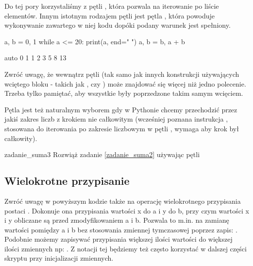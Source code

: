 \documentclass{pdfBooklets}
\begin{document}
Do tej pory korzystaliśmy z pętli , która pozwala na iterowanie po liście elementów. Innym istotnym rodzajem pętli
jest pętla , która powoduje wykonywanie zawartego w niej kodu dopóki podany warunek jest spełniony.

\begin{CodeFrame}[python]{0.50\textwidth}
a, b = 0, 1
while a <= 20:
    print(a, end=" ")
    a, b = b, a + b
\end{CodeFrame}
\begin{CodeFrame}{auto}
0 1 1 2 3 5 8 13
\end{CodeFrame}

Zwróć uwagę, że wewnątrz pętli  (tak samo jak innych konstrukcji używających wciętego bloku - takich jak , czy )
może znajdować się więcej niż jedno polecenie. Trzeba tylko pamiętać, aby wszystkie były poprzedzone takim samym wcięciem.

Pętla  jest też naturalnym wyborem gdy w Pythonie chcemy przechodzić przez jakiś zakres liczb z krokiem nie całkowitym
	(wcześniej poznana instrukcja , stosowana do iterowania po zakresie liczbowym w pętli , wymaga aby krok był całkowity).

\begin{Zadanie}{}{zadanie_suma3}
Rozwiąż zadanie \ref{zadanie_suma2} używając pętli 
\end{Zadanie}

\subsection{Wielokrotne przypisanie}

Zwróć uwagę w powyższym kodzie także na operację wielokrotnego przypisania postaci .
Dokonuje ona przypisania wartości x do a i y do b, przy czym wartości x i y obliczane są przed zmodyfikowaniem a i b.
Pozwala to m.in. na zamianę wartości pomiędzy a i b bez stosowania zmiennej tymczasowej poprzez zapis: .
Podobnie możemy zapisywać przypisania większej ilości wartości do większej ilości zmiennych np: .
Z notacji tej będziemy też często korzystać w dalszej części skryptu przy inicjalizacji zmiennych.

\end{document}
